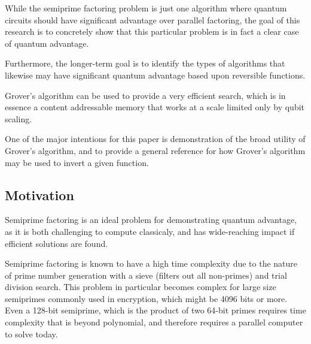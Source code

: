 \documentclass[twocolumn]{cinc}
\begin{document}
  While the semiprime factoring problem is just one algorithm where quantum circuits 
  should have significant advantage over parallel factoring, 
  the goal of this research is to concretely show that this particular problem is 
  in fact a clear case of quantum advantage.

  Furthermore, the longer-term goal is to identify the types of algorithms that 
  likewise may have significant quantum advantage based upon reversible functions.

  Grover's algorithm can be used to provide a very efficient search, 
  which is in essence a content addressable memory that works at a scale limited only by qubit scaling.

  One of the major intentions for this paper is demonstration of the broad utility of Grover's 
  algorithm, and to provide a general reference
  for how Grover's algorithm may be used to invert a given function.

  \subsection{Motivation}

  Semiprime factoring is an ideal problem for demonstrating quantum advantage,
  as it is both challenging to compute classicaly, and has wide-reaching
  impact if efficient solutions are found.

  Semiprime factoring is known to have a high time complexity due to the nature of
  prime number generation with a sieve (filters out all non-primes) and trial division search.
  This problem in particular becomes complex for large size semiprimes commonly used in 
  encryption, which might be 4096 bits or more. 
  Even a 128-bit semiprime, which is the product of two 64-bit primes requires time complexity
  that is beyond polynomial, and therefore requires a parallel computer to solve today. 
\end{document}
